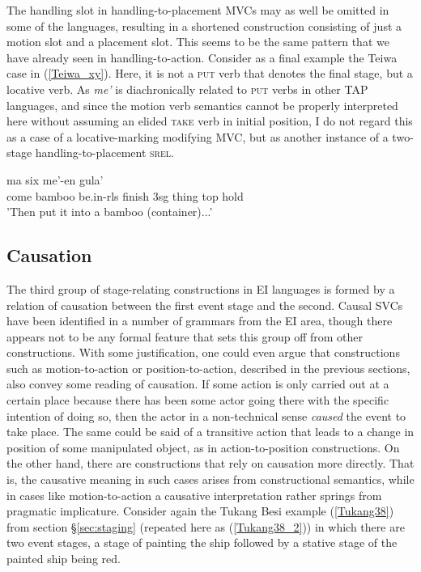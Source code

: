 The handling slot in handling-to-placement MVCs may as well be omitted in some of the languages, resulting in a shortened construction consisting of just a motion slot and a placement slot. This seems to be the same pattern that we have already seen in handling-to-action. Consider as a final example the Teiwa case in (\ref{Teiwa_xy}). Here, it is not a \textsc{put} verb that denotes the final stage, but a locative verb. As \textit{me'} is diachronically related to \textsc{put} verbs in other TAP languages, and since the motion verb semantics cannot be properly interpreted here without assuming an elided \textsc{take} verb in initial position, I do not regard this as a case of a locative-marking modifying MVC, but as another instance of a two-stage handling-to-placement \textsc{srel}.

\ea \label{Teiwa_xy}
\gll ma six me'-en gula' \\
come bamboo be.in-\acs{rls} finish 3\acs{sg} thing \acs{top} hold \\
\glft 'Then put it into a bamboo (container)...' \\ 
\z
\xe

\subsection{Causation} \label{sec:causation}

The third group of stage-relating constructions in EI languages is formed by a relation of causation between the first event stage and the second. Causal SVCs have been identified in a number of grammars from the EI area, though there appears not to be any formal feature that sets this group off from other constructions. With some justification, one could even argue that constructions such as motion-to-action or position-to-action, described in the previous sections, also convey some reading of causation. If some action is only carried out at a certain place because there has been some actor going there with the specific intention of doing so, then the actor in a non-technical sense \textit{caused} the event to take place. The same could be said of a transitive action that leads to a change in position of some manipulated object, as in action-to-position constructions. On the other hand, there are constructions that rely on causation more directly. That is, the causative  meaning in such cases arises from constructional semantics, while in cases like motion-to-action a causative interpretation rather springs from pragmatic implicature. Consider again the Tukang Besi example (\ref{Tukang38}) from section §\ref{sec:staging} (repeated here as (\ref{Tukang38_2})) in which there are two event stages, a stage of painting the ship followed by a stative stage of the painted ship being red.

